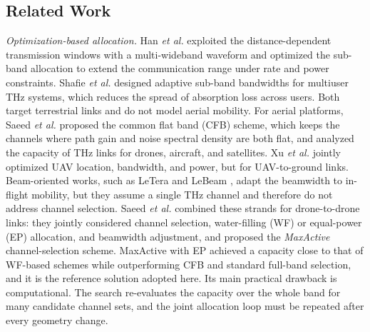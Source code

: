 \documentclass[correspondence]{IEEEtaes}
\begin{document}
\subsection{Related Work}
\emph{Optimization-based allocation.} Han \emph{et al.} \cite{han2016multiwideband}
exploited the distance-dependent transmission windows with a multi-wideband waveform and
optimized the sub-band allocation to extend the communication range under rate and power
constraints. Shafie \emph{et al.} \cite{shafie2022subband} designed adaptive sub-band
bandwidths for multiuser THz systems, which reduces the spread of absorption loss across
users. Both target terrestrial links and do not model aerial mobility. For aerial
platforms, Saeed \emph{et al.} \cite{saeed2021cfb} proposed the common flat band (CFB)
scheme, which keeps the channels where path gain and noise spectral density are both
flat, and analyzed the capacity of THz links for drones, aircraft, and satellites. Xu
\emph{et al.} \cite{xu2021thzuav} jointly optimized UAV location, bandwidth, and power,
but for UAV-to-ground links. Beam-oriented works, such as LeTera \cite{moorthy2020letera}
and LeBeam \cite{moorthy2022beam}, adapt the beamwidth to in-flight mobility, but they
assume a single THz channel and therefore do not address channel selection. Saeed
\emph{et al.} \cite{saeed2024maxactive} combined these strands for drone-to-drone links:
they jointly considered channel selection, water-filling (WF) or equal-power (EP)
allocation, and beamwidth adjustment, and proposed the \emph{MaxActive} channel-selection
scheme. MaxActive with EP achieved a capacity close to that of WF-based schemes while
outperforming CFB and standard full-band selection, and it is the reference solution
adopted here. Its main practical drawback is computational. The search re-evaluates the
capacity over the whole band for many candidate channel sets, and the joint allocation
loop must be repeated after every geometry change.
\end{document}
